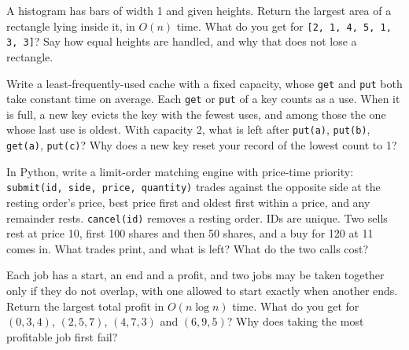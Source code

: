 \begin{question}\label{iq:iv3:algorithms:55}
A histogram has bars of width 1 and given heights. Return the largest area of a rectangle lying inside it, in $O(n)$ time. What do you get for \texttt{[2, 1, 4, 5, 1, 3, 3]}? Say how equal heights are handled, and why that does not lose a rectangle.
\end{question}

\begin{question}\label{iq:iv3:algorithms:56}
Write a least-frequently-used cache with a fixed capacity, whose \texttt{get} and \texttt{put} both take constant time on average. Each \texttt{get} or \texttt{put} of a key counts as a use. When it is full, a new key evicts the key with the fewest uses, and among those the one whose last use is oldest. With capacity 2, what is left after \texttt{put(a)}, \texttt{put(b)}, \texttt{get(a)}, \texttt{put(c)}? Why does a new key reset your record of the lowest count to 1?
\end{question}

\begin{question}\label{iq:iv3:algorithms:57}
In Python, write a limit-order matching engine with price-time priority: \texttt{submit(id, side, price, quantity)} trades against the opposite side at the resting order's price, best price first and oldest first within a price, and any remainder rests. \texttt{cancel(id)} removes a resting order. IDs are unique. Two sells rest at price 10, first 100 shares and then 50 shares, and a buy for 120 at 11 comes in. What trades print, and what is left? What do the two calls cost?
\end{question}

\begin{question}\label{iq:iv3:algorithms:58}
Each job has a start, an end and a profit, and two jobs may be taken together only if they do not overlap, with one allowed to start exactly when another ends. Return the largest total profit in $O(n \log n)$ time. What do you get for $(0, 3, 4)$, $(2, 5, 7)$, $(4, 7, 3)$ and $(6, 9, 5)$? Why does taking the most profitable job first fail?
\end{question}

